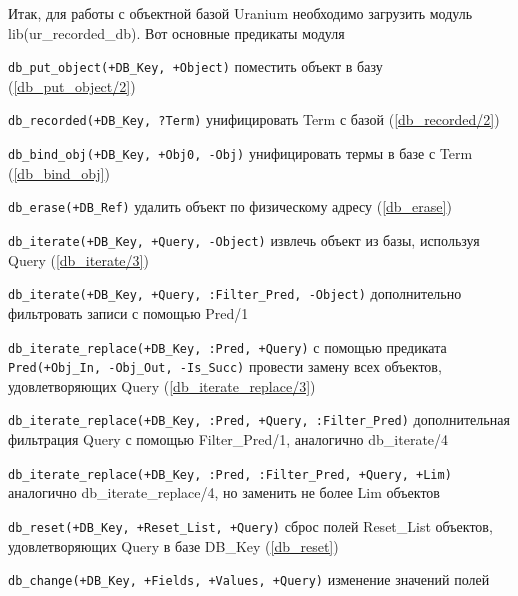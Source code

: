 \documentclass[a4paper]{book}
\def\ur{Uranium}
\begin{document}
Итак, для работы с объектной базой \ur{} необходимо загрузить
модуль lib(ur\_recorded\_db). Вот основные предикаты модуля

\begin{description}
\item \verb|db_put_object(+DB_Key, +Object)| поместить объект в
  базу (\ref{db_put_object/2})
\item \verb|db_recorded(+DB_Key, ?Term)| унифицировать Term с
  базой (\ref{db_recorded/2})
\item \verb|db_bind_obj(+DB_Key, +Obj0, -Obj)| унифицировать
  термы в базе с Term (\ref{db_bind_obj})

\item \verb|db_erase(+DB_Ref)| удалить объект по физическому
  адресу (\ref{db_erase})

\item \verb|db_iterate(+DB_Key, +Query, -Object)| извлечь объект
  из базы, используя Query (\ref{db_iterate/3})
\item \verb|db_iterate(+DB_Key, +Query, :Filter_Pred, -Object)|
  дополнительно фильтровать записи с помощью Pred/1
\item \verb|db_iterate_replace(+DB_Key, :Pred, +Query)| с помощью
  предиката \verb|Pred(+Obj_In, -Obj_Out, -Is_Succ)| провести
  замену всех объектов, удовлетворяющих Query
  (\ref{db_iterate_replace/3})
\item
  \verb|db_iterate_replace(+DB_Key, :Pred, +Query, :Filter_Pred)|
  дополнительная фильтрация Query с помощью Filter_Pred/1,
  аналогично db\_iterate/4
\item
  \verb|db_iterate_replace(+DB_Key, :Pred, :Filter_Pred, +Query, +Lim)|
  аналогично db_iterate_replace/4, но заменить не более Lim
  объектов
\item \verb|db_reset(+DB_Key, +Reset_List, +Query)| сброс полей
  Reset\_List объектов, удовлетворяющих Query в базе DB\_Key (\ref{db_reset})
\item \verb|db_change(+DB_Key, +Fields, +Values, +Query)|
  изменение значений полей 




\end{description}
\end{document}
